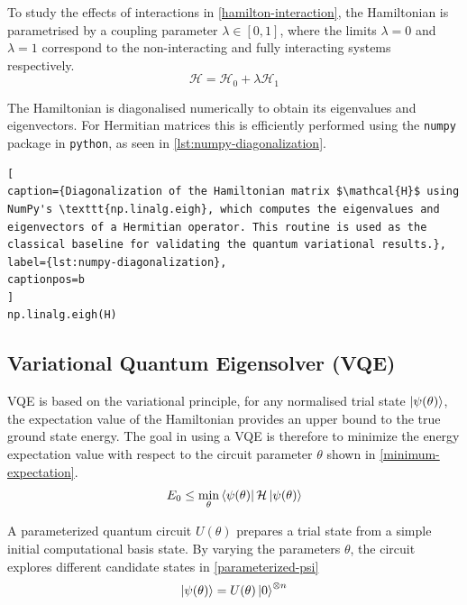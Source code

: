 To study the effects of interactions in \cref{hamilton-interaction}, the Hamiltonian is parametrised by a coupling parameter $\lambda\in[0,1]$, where the limits $\lambda=0$ and $\lambda=1$ correspond to the non-interacting and fully interacting systems respectively.
\begin{equation}\label{hamilton-interaction}
    \mathcal{H}=\mathcal{H}_0+\lambda \mathcal{H}_1
\end{equation}

The Hamiltonian is diagonalised numerically to obtain its eigenvalues and eigenvectors. For Hermitian matrices this is efficiently performed using the \texttt{numpy} package in \texttt{python}, as seen in \cref{lst:numpy-diagonalization}.\newline

\begin{lstlisting}[
caption={Diagonalization of the Hamiltonian matrix $\mathcal{H}$ using NumPy's \texttt{np.linalg.eigh}, which computes the eigenvalues and eigenvectors of a Hermitian operator. This routine is used as the classical baseline for validating the quantum variational results.},
label={lst:numpy-diagonalization},
captionpos=b
]
np.linalg.eigh(H)
\end{lstlisting}

\subsection{Variational Quantum Eigensolver (VQE)}

VQE is based on the variational principle, for any normalised trial state $\left| \psi(\theta) \right\rangle$, the expectation value of the Hamiltonian provides an upper bound to the true ground state energy. The goal in using a VQE is therefore to minimize the energy expectation value with respect to the circuit parameter $\theta$ shown in \cref{minimum-expectation}. 
\begin{equation}\label{minimum-expectation}
    E_0\leq\min_\theta\left\langle \psi(\theta) \right|\mathcal{H}\left| \psi(\theta) \right\rangle
\end{equation}

A parameterized quantum circuit $U(\theta)$ prepares a trial state from a simple initial computational basis state. By varying the parameters $\theta$, the circuit explores different candidate states in \cref{parameterized-psi}
\begin{equation}\label{parameterized-psi}
    \left| \psi(\theta) \right\rangle=U(\theta)\left| 0 \right\rangle^{\otimes n}
\end{equation}

